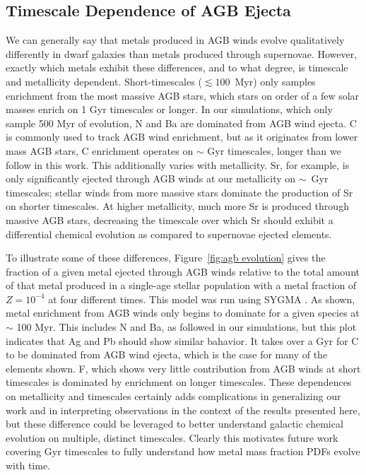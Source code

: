 \documentclass[twocolumn]{aastex61}
\begin{document}
\subsection{Timescale Dependence of AGB Ejecta}
\label{sec:discussion:metal yields}
We can generally say that metals produced in AGB winds evolve qualitatively differently in dwarf galaxies than metals produced through supernovae. However, exactly which metals exhibit these differences, and to what degree, is timescale and metallicity dependent. Short-timescales ($\lesssim 100$~Myr) only samples enrichment from the most massive AGB stars, which stars on order of a few solar masses enrich on 1 Gyr timescales or longer. In our simulations, which only sample 500 Myr of evolution, N and Ba are dominated from AGB wind ejecta. C is commonly used to track AGB wind enrichment, but as it originates from lower mass AGB stars, C enrichment operates on $\sim$ Gyr timescales, longer than we follow in this work. This additionally varies with metallicity. Sr, for example, is only significantly ejected through AGB winds at our metallicity on $\sim$~Gyr timescales; stellar winds from more massive stars dominate the production of Sr on shorter timescales. At higher metallicity, much more Sr is produced through massive AGB stars, decreasing the timescale over which Sr should exhibit a differential chemical evolution as compared to supernovae ejected elements.

To illustrate some of these differences, Figure~\ref{fig:agb evolution} gives the fraction of a given metal ejected through AGB winds relative to the total amount of that metal produced in a single-age stellar population with a metal fraction of $Z = 10^{-4}$ at four different times. This model was run using \textsc{SYGMA} \citep{Ritter2017}. As shown, metal enrichment from AGB winds only begins to dominate for a given species at $\sim$ 100 Myr. This includes N and Ba, as followed in our simulations, but this plot indicates that Ag and Pb should show similar bahavior. It takes over a Gyr for C to be dominated from AGB wind ejecta, which is the case for many of the elements shown. F, which shows very little contribution from AGB winds at short timescales is dominated by enrichment on longer timescales. These dependences on metallicity and timescales certainly adds complications in generalizing our work and in interpreting observations in the context of the results presented here, but these difference could be leveraged to better understand galactic chemical evolution on multiple, distinct timescales. Clearly this motivates future work covering Gyr timescales to fully understand how metal mass fraction PDFs evolve with time.
\end{document}
